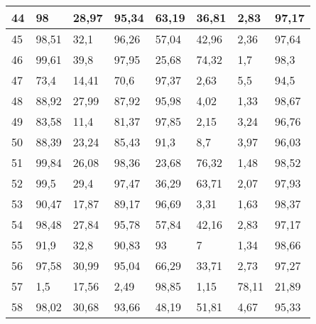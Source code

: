 \begin{longtable}[c]{|l|l|l|l|l|l|l|l|}
44              & 98           & 28,97        & 95,34       & 63,19         & 36,81         & 2,83          & 97,17         \\ \hline
45              & 98,51        & 32,1         & 96,26       & 57,04         & 42,96         & 2,36          & 97,64         \\ \hline
46              & 99,61        & 39,8         & 97,95       & 25,68         & 74,32         & 1,7           & 98,3          \\ \hline
47              & 73,4         & 14,41        & 70,6        & 97,37         & 2,63          & 5,5           & 94,5          \\ \hline
48              & 88,92        & 27,99        & 87,92       & 95,98         & 4,02          & 1,33          & 98,67         \\ \hline
49              & 83,58        & 11,4         & 81,37       & 97,85         & 2,15          & 3,24          & 96,76         \\ \hline
50              & 88,39        & 23,24        & 85,43       & 91,3          & 8,7           & 3,97          & 96,03         \\ \hline
51              & 99,84        & 26,08        & 98,36       & 23,68         & 76,32         & 1,48          & 98,52         \\ \hline
52              & 99,5         & 29,4         & 97,47       & 36,29         & 63,71         & 2,07          & 97,93         \\ \hline
53              & 90,47        & 17,87        & 89,17       & 96,69         & 3,31          & 1,63          & 98,37         \\ \hline
54              & 98,48        & 27,84        & 95,78       & 57,84         & 42,16         & 2,83          & 97,17         \\ \hline
55              & 91,9         & 32,8         & 90,83       & 93            & 7             & 1,34          & 98,66         \\ \hline
56              & 97,58        & 30,99        & 95,04       & 66,29         & 33,71         & 2,73          & 97,27         \\ \hline
57              & 1,5          & 17,56        & 2,49        & 98,85         & 1,15          & 78,11         & 21,89         \\ \hline
58              & 98,02        & 30,68        & 93,66       & 48,19         & 51,81         & 4,67          & 95,33         \\ \hline

\end{longtable}
